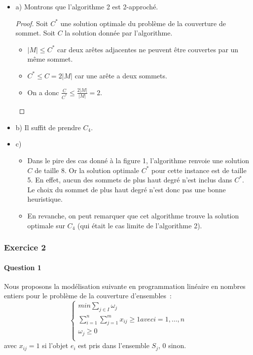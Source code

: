 \documentclass[a4paper, 12pt]{article}
\begin{document}
\begin{itemize}
\item[] a) Montrons que l'algorithme 2 est 2-approché.
\begin{proof}
Soit $C^{*}$ une solution optimale du problème de la couverture de
sommet. Soit $C$ la solution donnée par l'algorithme. 
\begin{itemize}
\item[] $|M| \leq C^{*}$ car deux arêtes adjacentes ne peuvent être
  couvertes par un même sommet.
\item[] $C^{*} \leq C = 2 |M|$ car une arête a deux sommets.
\item[] On a donc $\frac{C}{C^{*}} \leq \frac{2|M|}{|M|} = 2$.
\end{itemize}
\end{proof}
\item[] b) Il suffit de prendre $C_4$.
\item[] c) 
\begin{itemize}
\item[] Dans le pire des cas donné à la figure 1, l'algorithme renvoie
  une solution $C$ de taille 8. Or la solution optimale $C^*$ pour cette
  instance est de taille 5. En effet, aucun des sommets de plus haut
  degré n'est inclus dans $C^{*}$. Le choix du sommet de plus haut
  degré n'est donc pas une bonne heuristique. 
\item[] En revanche, on peut remarquer que cet algorithme trouve la
  solution optimale sur $C_4$ (qui était le cas limite de l'algorithme 2).
\end{itemize}
\end{itemize}

\subsubsection*{Exercice 2}

\paragraph{Question 1}

Nous proposons la modélisation suivante en programmation linéaire en
nombres entiers pour le problème de la couverture d'ensembles~:
\begin{equation}
\begin{cases}
min \sum_{j \in I} \omega_j \\
\sum_{i=1}^{n} \sum_{j=1}^{m} x_{ij} \geq 1  avec i=1, \dots, n \\
\omega_j \geq 0 \\
\end{cases}
\end{equation}
avec $x_{ij} = 1$ si l'objet $e_i$ est pris dans l'ensemble $S_j$, 0 sinon.
\end{document}
